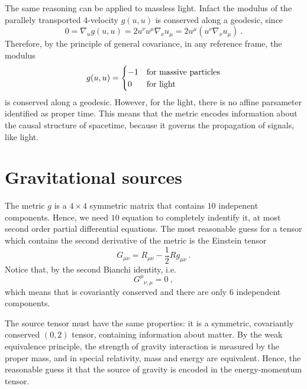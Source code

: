     The same reasoning can be applied to massless light. Infact the modulus of the parallely transported $4$-velocity $g(u, u)$ is conserved along a geodesic, since 
    \begin{equation*}
        0 = \nabla_u g(u,u) = 2 u^\nu u^\mu \nabla_\nu u_\mu = 2 u^\mu (u^\nu \nabla_\nu u_\mu) ~.
    \end{equation*}
    Therefore, by the principle of general covariance, in any reference frame, the modulus
    \begin{equation*}
        g(u,u) = \begin{cases}
            - 1 & \textnormal{for massive particles} \\
            0 & \textnormal{for light} \\
        \end{cases}
    \end{equation*}
    is conserved along a geodesic. However, for the light, there is no affine parsameter identified as proper time. This means that the metric encodes information about the causal structure of spacetime, because it governs the propagation of signals, like light.

\section{Gravitational sources}

    The metric $g$ is a $4 \times 4$ symmetric matrix that contains $10$ indepenent components. Hence, we need $10$ equation to completely indentify it, at most second order partial differential equations. The most reasonable guess for a tensor which contains the second derivative of the metric is the Einstein tensor 
    \begin{equation*}
        G_{\mu\nu} = R_{\mu\nu} - \frac{1}{2} R g_{\mu\nu} ~.
    \end{equation*}
    Notice that, by the second Bianchi identity, i.e.
    \begin{equation*}
        G^\mu_{\phantom \mu \nu, \mu} = 0 ~,
    \end{equation*}
    which means that is covariantly conserved and there are only $6$ independent components. 

    The source tensor must have the same properties: it is a symmetric, covariantly conserved $(0,2)$ tensor, containing information about matter. By the weak equivalence principle, the strength of gravity interaction is measured by the proper mass, and in special relativity, mass and energy are equivalent. Hence, the reasonable guess it that the source of gravity is encoded in the energy-momentum tensor. 

